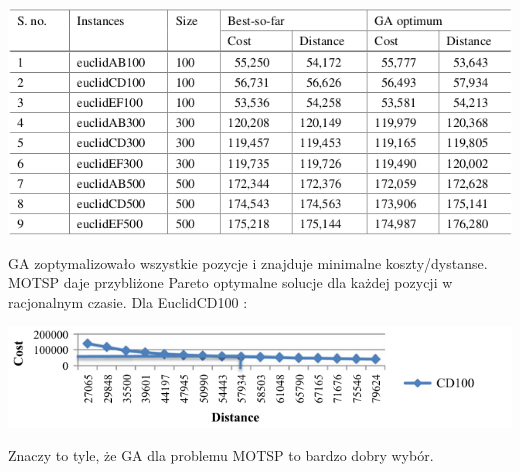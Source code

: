 \documentclass[11pt]{article}
\begin{document}
\begin{center}
\includegraphics[scale=.5]{rank.png}
\end{center}
GA zoptymalizowało  wszystkie pozycje i znajduje minimalne koszty/dystanse. MOTSP daje przybliżone Pareto optymalne solucje dla każdej pozycji w racjonalnym czasie. Dla EuclidCD100 :\\
\begin{center}
\includegraphics[scale=0.6]{ecd100.png}
\end{center}
Znaczy to tyle, że GA dla problemu MOTSP to bardzo dobry wybór.
\end{document}
